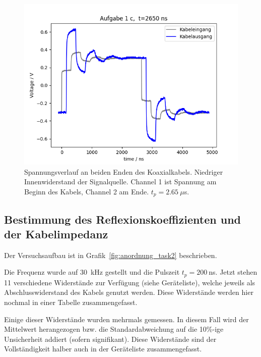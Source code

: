 \documentclass{article}
\begin{document}
\begin{figure}[H]
\centering
\caption{Spannungsverlauf an beiden Enden des Koaxialkabels. Niedriger Innenwiderstand der Signalquelle. Channel 1 ist Spannung am Beginn des Kabels, Channel 2 am Ende. $t_p = 2.65~\mu$s.}
\label{fig:task1b_2650ns}
\includegraphics[scale=0.6]{bilder/task1c/task1c_2650ns.png}
\end{figure}



\subsection{Bestimmung des Reflexionskoeffizienten und der Kabelimpedanz}

Der Versuchsaufbau ist in Grafik~\ref{fig:anordnung_task2} beschrieben.

Die Frequenz wurde auf 30~kHz gestellt und die Pulszeit $t_p = 200~$ns. Jetzt stehen 11 verschiedene Widerstände zur Verfügung (siehe Geräteliste), welche jeweils als Abschlusswiderstand des Kabels genutzt werden. Diese Widerstände werden hier nochmal in einer Tabelle zusammengefasst.

Einige dieser Widerstände wurden mehrmals gemessen. In diesem Fall wird der Mittelwert herangezogen bzw. die Standardabweichung auf die 10\%-ige Unsicherheit addiert (sofern signifikant). Diese Widerstände sind der Vollständigkeit halber auch in der Geräteliste zusammengefasst.
\end{document}
